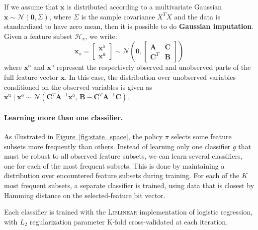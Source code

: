 If we assume that $\mathbf{x}$ is distributed according to a multivariate Gaussian $\mathbf{x} \sim \mathcal{N}(\mathbf{0}, \Sigma)$, where $\Sigma$ is the sample covariance $X^T X$ and the data is standardized to have zero mean, then it is possible to do \textbf{Gaussian imputation}.
Given a feature subset $\mathcal{H}_\pi$, we write:
\begin{equation}
\mathbf{x}_\pi = \begin{bmatrix} \mathbf{x}^\text{o}\\  \mathbf{x}^\text{u} \end{bmatrix} \sim \mathcal{N} \left( \mathbf{0}, \begin{bmatrix} \mathbf{A} & \mathbf{C}\\ \mathbf{C}^T & \mathbf{B} \end{bmatrix} \right)
\end{equation}
where $\mathbf{x}^\text{o}$ and $\mathbf{x}^\text{u}$ represent the respectively observed and unobserved parts of the full feature vector $\mathbf{x}$.
In this case, the distribution over unobserved variables conditioned on the observed variables is given as
$\mathbf{x}^\text{u} \mid \mathbf{x}^\text{o} \sim \mathcal{N} \left( \mathbf{C}^T \mathbf{A}^{-1} \mathbf{x}^\text{o},\, \mathbf{B} - \mathbf{C}^T \mathbf{A}^{-1} \mathbf{C} \right)$.

\paragraph{Learning more than one classifier.}
As illustrated in \hyperref[fig:state_space]{Figure~\ref*{fig:state_space}}, the policy $\pi$ selects some feature subsets more frequently than others.
Instead of learning only one classifier $g$ that must be robust to all observed feature subsets, we can learn several classifiers, one for each of the most frequent subsets.
This is done by maintaining a distribution over encountered feature subsets during training.
For each of the $K$ most frequent subsets, a separate classifier is trained, using data that is closest by Hamming distance on the selected-feature bit vector.

Each classifier is trained with the \textsc{Liblinear} implementation of logistic regression, with $L_2$ regularization parameter K-fold cross-validated at each iteration.

